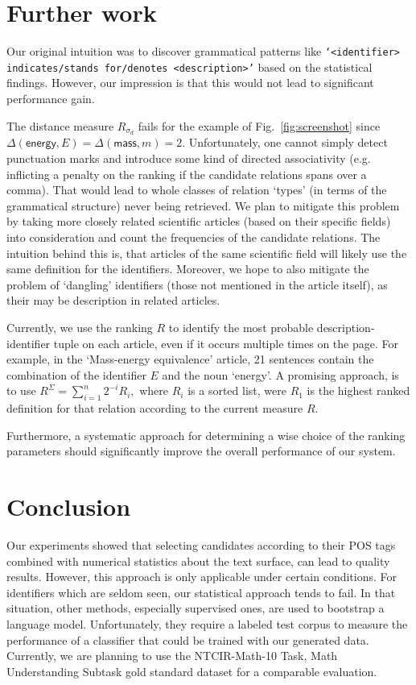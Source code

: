 \documentclass[runningheads]{llncs}
\begin{document}
\section{Further work}

Our original intuition was to discover grammatical patterns like
\texttt{`\emph{<identifier>} indicates/stands for/denotes
\emph{<description>}'} based on the statistical findings. However, our
impression is that this would not lead to significant performance gain.

The distance measure $R_{\sigma_d}$ fails for the example of
Fig.~\ref{fig:screenshot} since $\Delta(\mathsf{energy},E) =
\Delta(\mathsf{mass},m) = 2$. Unfortunately, one cannot simply detect
punctuation marks and introduce some kind of directed associativity (e.g.
inflicting a penalty on the ranking if the candidate relations spans over a
comma). That would lead to whole classes of relation `types' (in terms of the
grammatical structure) never being retrieved. We plan to mitigate this problem
by taking more closely related scientific articles (based on their specific
fields) into consideration and count the frequencies of the candidate
relations. The intuition behind this is, that articles of the same scientific
field will likely use the same definition for the identifiers. Moreover,
we hope to also mitigate the problem of `dangling' identifiers (those not
mentioned in the article itself), as their may be description in related
articles.


Currently, we use the ranking $R$ to identify the most probable description-
identifier tuple on each article, even if it occurs multiple times on the page.
For example, in the `Mass-energy equivalence' article, 21 sentences contain the
combination of the identifier $E$ and the noun `energy'. A promising approach,
is to use $R^\Sigma=\sum_{i=1}^n 2^{-i} R_i,$ where $R_i$ is a sorted list,
were $R_1$ is the highest ranked definition for that relation according to the
current measure $R$.


Furthermore, a systematic approach for determining a wise choice of the
ranking parameters should significantly improve the overall performance of our
system.


\section{Conclusion}

Our experiments showed that selecting candidates according to their POS tags
combined with numerical statistics about the text surface, can lead to quality
results. However, this approach is only applicable under certain conditions.
For identifiers which are seldom seen, our statistical approach tends to fail.
In that situation, other methods, especially supervised ones, are used to
bootstrap a language model. Unfortunately, they require a labeled test corpus
to measure the performance of a classifier that could be trained with our
generated data. Currently, we are planning to use the NTCIR-Math-10 Task, Math
Understanding Subtask gold standard dataset \cite{overview} for a comparable
evaluation.
\end{document}
